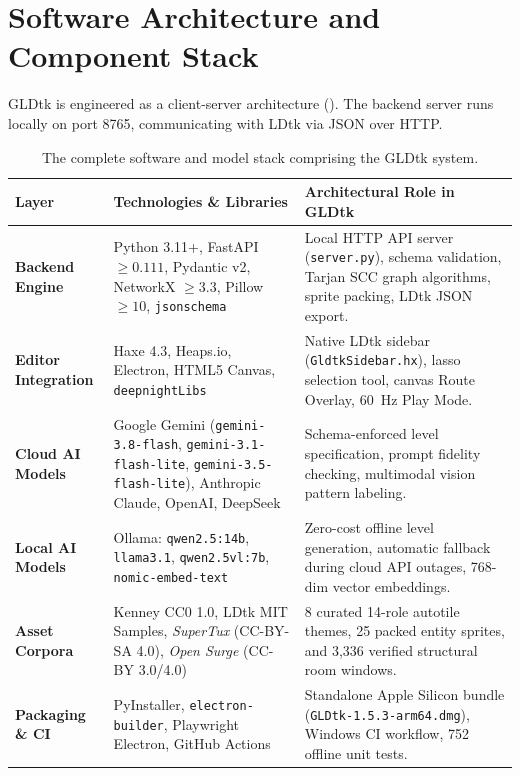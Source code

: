 \documentclass[11pt,a4paper]{report}
\theoremstyle{definition}
\theoremstyle{remark}
\begin{document}
\section{Software Architecture and Component Stack}
GLDtk is engineered as a client-server architecture (). The backend server runs locally on port 8765, communicating with LDtk via JSON over HTTP.

\begin{table}[htbp]
\centering
\small
\caption{The complete software and model stack comprising the GLDtk system.}
\label{tab:tech_stack}
\begin{tabularx}{\textwidth}{l p{4.2cm} X}
\toprule
\textbf{Layer} & \textbf{Technologies \& Libraries} & \textbf{Architectural Role in GLDtk} \\
\midrule
\textbf{Backend Engine} & Python 3.11+, FastAPI $\ge 0.111$, Pydantic v2, NetworkX $\ge 3.3$, Pillow $\ge 10$, \texttt{jsonschema} & Local HTTP API server (\texttt{server.py}), schema validation, Tarjan SCC graph algorithms, sprite packing, LDtk JSON export. \\
\addlinespace
\textbf{Editor Integration} & Haxe 4.3, Heaps.io, Electron, HTML5 Canvas, \texttt{deepnightLibs} & Native LDtk sidebar (\texttt{GldtkSidebar.hx}), lasso selection tool, canvas Route Overlay, 60~Hz Play Mode. \\
\addlinespace
\textbf{Cloud AI Models} & Google Gemini (\texttt{gemini-3.8-flash}, \texttt{gemini-3.1-flash-lite}, \texttt{gemini-3.5-flash-lite}), Anthropic Claude, OpenAI, DeepSeek & Schema-enforced level specification, prompt fidelity checking, multimodal vision pattern labeling. \\
\addlinespace
\textbf{Local AI Models} & Ollama: \texttt{qwen2.5:14b}, \texttt{llama3.1}, \texttt{qwen2.5vl:7b}, \texttt{nomic-embed-text} & Zero-cost offline level generation, automatic fallback during cloud API outages, 768-dim vector embeddings. \\
\addlinespace
\textbf{Asset Corpora} & Kenney CC0 1.0, LDtk MIT Samples, \emph{SuperTux} (CC-BY-SA 4.0), \emph{Open Surge} (CC-BY 3.0/4.0) & 8 curated 14-role autotile themes, 25 packed entity sprites, and 3,336 verified structural room windows. \\
\addlinespace
\textbf{Packaging \& CI} & PyInstaller, \texttt{electron-builder}, Playwright Electron, GitHub Actions & Standalone Apple Silicon bundle (\texttt{GLDtk-1.5.3-arm64.dmg}), Windows CI workflow, 752 offline unit tests. \\
\bottomrule
\end{tabularx}
\end{table}
\end{document}
